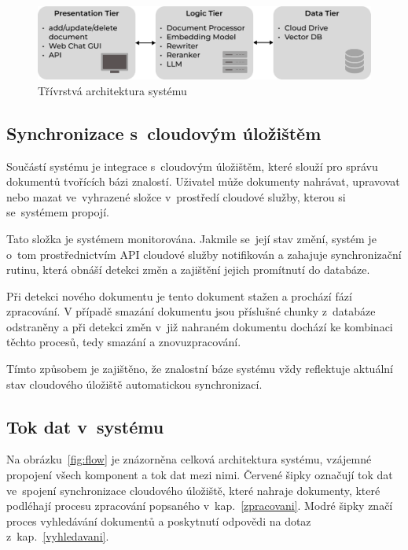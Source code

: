 \begin{figure}[H]
    \centering
    \includegraphics[width=0.9\linewidth]{obrazky/threetier.pdf}
    \caption{Třívrstvá architektura systému}
    \label{fig:three-tier}
\end{figure}

\subsection{Synchronizace s~cloudovým úložištěm}

Součástí systému je integrace s~cloudovým úložištěm, které slouží pro správu dokumentů tvořících bázi znalostí. Uživatel může dokumenty nahrávat, upravovat nebo mazat ve~vyhrazené složce v~prostředí cloudové služby, kterou si se~systémem propojí. 

Tato složka je systémem monitorována. Jakmile se~její stav změní, systém je o~tom prostřednictvím API cloudové služby notifikován a zahajuje synchronizační rutinu, která obnáší detekci změn a zajištění jejich promítnutí do databáze.

Při detekci nového dokumentu je tento dokument stažen a prochází fází zpracování. V případě smazání dokumentu jsou příslušné chunky z~databáze odstraněny a při detekci změn v~již nahraném dokumentu dochází ke kombinaci těchto procesů, tedy smazání a znovuzpracování.

Tímto způsobem je zajištěno, že znalostní báze systému vždy reflektuje aktuální stav cloudového úložiště automatickou synchronizací.

\subsection{Tok dat v~systému}

Na obrázku~\ref{fig:flow} je znázorněna celková architektura systému, vzájemné propojení všech komponent a tok dat mezi nimi. Červené šipky označují tok dat ve~spojení synchronizace cloudového úložiště, které nahraje dokumenty, které podléhají procesu zpracování popsaného v~kap.~\ref{zpracovani}. Modré šipky značí proces vyhledávání dokumentů a poskytnutí odpovědi na dotaz z~kap.~\ref{vyhledavani}.

